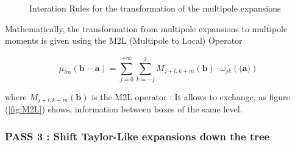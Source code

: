 \documentclass[12pt,twoside,a4paper]{report}
\begin{document}
	 
 \begin{figure}[H]
    \centering 
    \caption{Interation Rules for the transformation of the multipole expansions}
    \label{fig:multipole}
   \end{figure}   
   
	  Mathematically, the transformation from multipole expansions to multipole moments is given using the  M2L (Multipole to Local) Operator
	  
	  \begin{equation}
	  \mu_{lm}(\textbf{b} - \textbf{a}) = \sum\limits_{j = 0}^{+\infty} \sum\limits_{k=-j}^{j}
	  M_{j+l,k+m}(\textbf{b}) \cdot \omega_{jk}(\textbf{(a)})
	  \end{equation}
   
   	where $M_{j+l,k+m}(\textbf{b})$ is the M2L operator : It allows to exchange, as figure (\ref{fig:M2L}) shows, information between boxes of the same level.

\subsubsection{PASS 3 : Shift Taylor-Like expansions down the tree}
\end{document}
